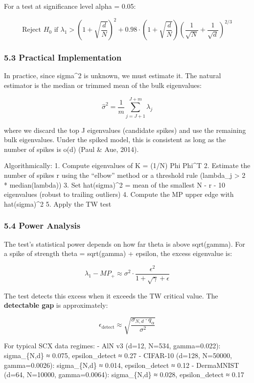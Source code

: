 \documentclass[
  12pt,
]{article}
\begin{document}
For a test at significance level alpha = 0.05:

\[\text{Reject } H_0 \text{ if } \lambda_1 > \left(1 + \sqrt{\frac{d}{N}}\right)^2 + 0.98 \cdot \left(1 + \sqrt{\frac{d}{N}}\right) \left(\frac{1}{\sqrt{N}} + \frac{1}{\sqrt{d}}\right)^{2/3}\]

\subsubsection{5.3 Practical
Implementation}\label{practical-implementation}

In practice, since sigma\^{}2 is unknown, we must estimate it. The
natural estimator is the median or trimmed mean of the bulk eigenvalues:

\[\hat{\sigma}^2 = \frac{1}{m} \sum_{j=J+1}^{J+m} \lambda_j\]

where we discard the top J eigenvalues (candidate spikes) and use the
remaining bulk eigenvalues. Under the spiked model, this is consistent
as long as the number of spikes is o(d) (Paul \& Aue, 2014).

Algorithmically: 1. Compute eigenvalues of K = (1/N) Phi Phi\^{}T 2.
Estimate the number of spikes r using the ``elbow'' method or a
threshold rule (lambda\_j \textgreater{} 2 * median(lambda)) 3. Set
hat(sigma)\^{}2 = mean of the smallest N - r - 10 eigenvalues (robust to
trailing outliers) 4. Compute the MP upper edge with hat(sigma)\^{}2 5.
Apply the TW test

\subsubsection{5.4 Power Analysis}\label{power-analysis}

The test's statistical power depends on how far theta is above
sqrt(gamma). For a spike of strength theta = sqrt(gamma) + epsilon, the
excess eigenvalue is:

\[\lambda_1 - MP_+ \approx \sigma^2 \cdot \frac{\epsilon^2}{1 + \sqrt{\gamma} + \epsilon}\]

The test detects this excess when it exceeds the TW critical value. The
\textbf{detectable gap} is approximately:

\[\epsilon_{\text{detect}} \approx \sqrt{ \frac{\sigma_{N,d} \cdot q_\alpha}{\sigma^2} }\]

For typical SCX data regimes: - AlN v3 (d=12, N=534, gamma=0.022):
sigma\_\{N,d\} ≈ 0.075, epsilon\_detect ≈ 0.27 - CIFAR-10 (d=128,
N=50000, gamma=0.0026): sigma\_\{N,d\} ≈ 0.014, epsilon\_detect ≈ 0.12 -
DermaMNIST (d=64, N=10000, gamma=0.0064): sigma\_\{N,d\} ≈ 0.028,
epsilon\_detect ≈ 0.17
\end{document}
